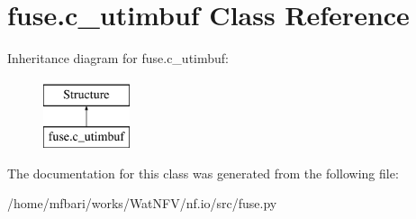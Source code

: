 \hypertarget{classfuse_1_1c__utimbuf}{\section{fuse.\-c\-\_\-utimbuf Class Reference}
\label{classfuse_1_1c__utimbuf}
}
Inheritance diagram for fuse.\-c\-\_\-utimbuf\-:\begin{figure}[H]
\begin{center}
\leavevmode
\includegraphics[height=2.000000cm]{classfuse_1_1c__utimbuf}
\end{center}
\end{figure}


The documentation for this class was generated from the following file\-:\begin{DoxyCompactItemize}
\item 
/home/mfbari/works/\-Wat\-N\-F\-V/nf.\-io/src/fuse.\-py\end{DoxyCompactItemize}
